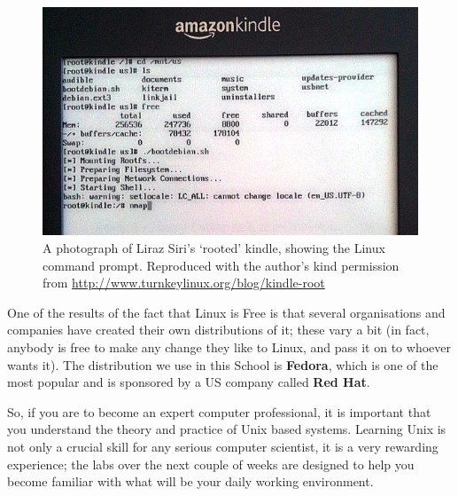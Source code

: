 \begin{figure}[h!tb]
  \begin{center}
    \includegraphics[width=13cm]{images/kindleroot}
  \end{center}
\caption{A photograph of Liraz Siri's `rooted' kindle, showing the Linux command prompt. Reproduced with the author's kind permission from \url{http://www.turnkeylinux.org/blog/kindle-root}}
\label{fig:kindlelinux}
\end{figure}

One of the results of the fact that Linux is Free is that several
organisations and companies have created their own distributions of
it; these vary a bit (in fact, anybody is free to make any change they
like to Linux, and pass it on to whoever wants it). The distribution
we use in this School is \textbf{Fedora}, which is
one of the most popular and is sponsored by a
US company called \textbf{Red Hat}.

So, if you are to become an expert computer professional, it is
important that you understand the theory and practice of Unix based
systems. Learning Unix is not only a crucial skill for any serious
computer scientist, it is a very rewarding experience; the labs over
the next couple of weeks are designed to help you become familiar with what will be your daily working environment.

